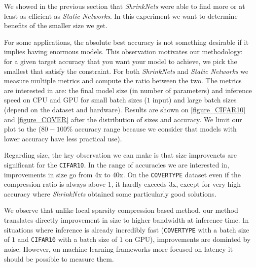 We showed in the previous section that \textit{ShrinkNets} were able to find
more or at least as efficient as \textit{Static Networks}. In this experiment we
want to determine benefits of the smaller size we get.

For some applications, the absolute best accuracy is not something desirable if
it implies having enormous models. This observation motivates our methodology:
for a given target accuracy that you want your model to achieve, we pick the
smallest that satisfy the constraint. For both \textit{ShrinkNets} and
\textit{Static Networks} we measure multiple metrics and compute the ratio
between the two. The metrics are interested in are: the final model size (in
number of parameters) and inference speed on CPU and GPU for small batch sizes
($1$ input) and large batch sizes (depend on the dataset and hardware). Results
are shown on \cref{figure_CIFAR10} and \cref{figure_COVER} after the
distribution of sizes and accuracy. We limit our plot to the ($80-100\%$
accuracy range because we consider that models with lower accuracy have less
practical use).

Regarding size, the key observation we can make is that size improvenets are
significant for the \texttt{CIFAR10}. In the range of accuracies we are
interested in, improvements in size go from 4x to 40x. On the \texttt{COVERTYPE}
dataset even if the compression ratio is always above 1, it hardly exceeds 3x,
except for very high accuracy where \textit{ShrinkNets} obtained some
particularly good solutions.

We observe that unlike local sparsity compression based method, our method
translates directly improvement in size to higher bandwidth at inference time.
In situations where inference is already incredibly fast (\texttt{COVERTYPE}
with a batch size of $1$ and \texttt{CIFAR10} with a batch size of $1$ on GPU),
improvements are dominted by noise. However, on machine learning frameworks
more focused on latency it should be possible to measure them.


% 

